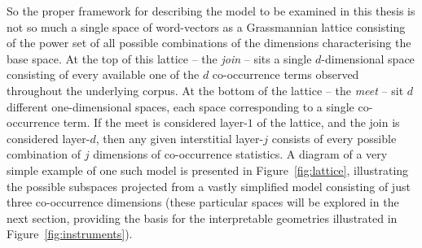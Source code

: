 
So the proper framework for describing the model to be examined in this thesis is not so much a single space of word-vectors as a Grassmannian lattice consisting of the power set of all possible combinations of the dimensions characterising the base space.  At the top of this lattice -- the \emph{join} -- sits a single $d$-dimensional space consisting of every available one of the $d$ co-occurrence terms observed throughout the underlying corpus.  At the bottom of the lattice -- the \emph{meet} -- sit $d$ different one-dimensional spaces, each space corresponding to a single co-occurrence term.  If the meet is considered layer-$1$ of the lattice, and the join is considered layer-$d$, then any given interstitial layer-$j$ consists of every possible combination of $j$ dimensions of co-occurrence statistics.  A diagram of a very simple example of one such model is presented in Figure~\ref{fig:lattice}, illustrating the possible subspaces projected from a vastly simplified model consisting of just three co-occurrence dimensions (these particular spaces will be explored in the next section, providing the basis for the interpretable geometries illustrated in Figure~\ref{fig:instruments}).

